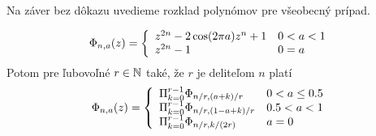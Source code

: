 Na záver bez dôkazu uvedieme rozklad polynómov pre všeobecný prípad.
\begin{veta}
\begin{equation}
    \Phi_{n,a}(z) = \left\{
        \begin{array}{l l}
            z^{2n} - 2\cos(2\pi a) z^n +1 & 0<a<1 \\
            z^{2n} -1 & 0=a
        \end{array}
    \right.
\end{equation}
Potom pre ľubovoľné $r\in\mathbb{N}$ také, že $r$ je deliteľom $n$ platí
\begin{equation}
    \Phi_{n,a}(z) = \left\{
    \begin{array}{l l}
        \Pi_{k=0}^{r-1} \Phi_{n/r, (a+k)/r} & 0<a\le 0.5 \\
        \Pi_{k=0}^{r-1} \Phi_{n/r, (1-a+k)/r} & 0.5<a<1 \\
        \Pi_{k=0}^{r-1} \Phi_{n/r, k/(2r)} & a=0

    \end{array}
    \right.
\end{equation}

\end{veta}


